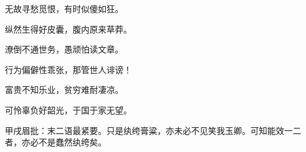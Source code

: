 \begin{poem}
    \begin{pl} 无故寻愁觅恨，有时似傻如狂。\end{pl}

    \begin{pl} 纵然生得好皮囊，腹内原来草莽。\end{pl}

    \begin{pl} 潦倒不通世务，愚顽怕读文章。\end{pl}

    \begin{pl} 行为偏僻性乖张，那管世人诽谤！\end{pl}

    \emptypl

    \begin{pl} 富贵不知乐业，贫穷难耐凄凉。\end{pl}

    \begin{pl} 可怜辜负好韶光，于国于家无望。\end{pl}

    \begin{note}甲戌眉批：末二语最紧要。只是纨绔膏粱，亦未必不见笑我玉卿。可知能效一二者，亦必不是蠢然纨绔矣。\end{note}
\end{poem}


